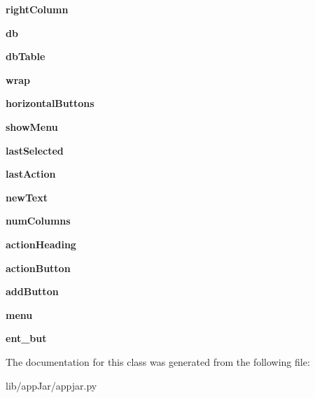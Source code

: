 \begin{DoxyCompactItemize}
{\bfseries right\+Column}
\item 
\mbox{\label{classappjar_1_1_simple_table_aea74937b28a3ee8b4077cea21e80d358}} 
{\bfseries db}
\item 
\mbox{\label{classappjar_1_1_simple_table_ae03e23f7c5347bcb9aa6f0b76a9576a1}} 
{\bfseries db\+Table}
\item 
\mbox{\label{classappjar_1_1_simple_table_a938dee696c8fde24f9a925b1800b0368}} 
{\bfseries wrap}
\item 
\mbox{\label{classappjar_1_1_simple_table_afee340b31f84128997b5f6707c2b99cf}} 
{\bfseries horizontal\+Buttons}
\item 
\mbox{\label{classappjar_1_1_simple_table_af1bbfc5f849a00c434958cef96425283}} 
{\bfseries show\+Menu}
\item 
\mbox{\label{classappjar_1_1_simple_table_a9659f74bf7ce2b7119b738fc046c2c6d}} 
{\bfseries last\+Selected}
\item 
\mbox{\label{classappjar_1_1_simple_table_aaf33abd0485bd84f5ebb5bedb07f65d8}} 
{\bfseries last\+Action}
\item 
\mbox{\label{classappjar_1_1_simple_table_aed1f9448d0dbb688c277aa0670f3004a}} 
{\bfseries new\+Text}
\item 
\mbox{\label{classappjar_1_1_simple_table_aff482f515158c716b2660e50650c801f}} 
{\bfseries num\+Columns}
\item 
\mbox{\label{classappjar_1_1_simple_table_a4a2b69f671440e33aa4d591976e48724}} 
{\bfseries action\+Heading}
\item 
\mbox{\label{classappjar_1_1_simple_table_a0d9a31fc6557e9215161a7a88e480a51}} 
{\bfseries action\+Button}
\item 
\mbox{\label{classappjar_1_1_simple_table_a5f599ada1bae9b750531ce7e33d0cee8}} 
{\bfseries add\+Button}
\item 
\mbox{\label{classappjar_1_1_simple_table_a81f979913d22071c7a1a15da62eb5033}} 
{\bfseries menu}
\item 
\mbox{\label{classappjar_1_1_simple_table_a08782b5f932e4acd41a5d1f889a32b9f}} 
{\bfseries ent\+\_\+but}
\end{DoxyCompactItemize}


The documentation for this class was generated from the following file\+:\begin{DoxyCompactItemize}
\item 
lib/app\+Jar/appjar.\+py\end{DoxyCompactItemize}
